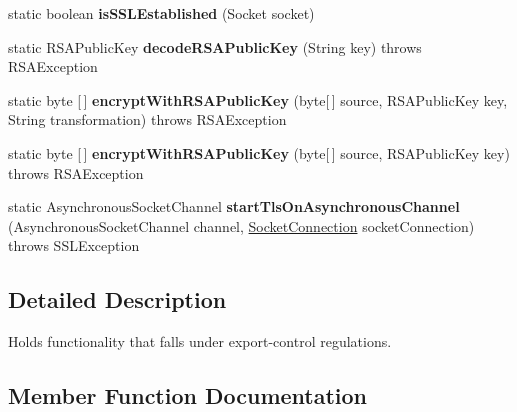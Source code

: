 \begin{DoxyCompactItemize}
static boolean {\bfseries is\+S\+S\+L\+Established} (Socket socket)
\item 
\mbox{\label{classcom_1_1mysql_1_1cj_1_1protocol_1_1_export_controlled_a909eca9940fffbea1168d1f27c6794da}} 
static R\+S\+A\+Public\+Key {\bfseries decode\+R\+S\+A\+Public\+Key} (String key)  throws R\+S\+A\+Exception 
\item 
\mbox{\label{classcom_1_1mysql_1_1cj_1_1protocol_1_1_export_controlled_aa9026bc31e213be6337010026aa89632}} 
static byte \mbox{[}$\,$\mbox{]} {\bfseries encrypt\+With\+R\+S\+A\+Public\+Key} (byte\mbox{[}$\,$\mbox{]} source, R\+S\+A\+Public\+Key key, String transformation)  throws R\+S\+A\+Exception 
\item 
\mbox{\label{classcom_1_1mysql_1_1cj_1_1protocol_1_1_export_controlled_a8a20678c3f99068fe3230c7e60efcf29}} 
static byte \mbox{[}$\,$\mbox{]} {\bfseries encrypt\+With\+R\+S\+A\+Public\+Key} (byte\mbox{[}$\,$\mbox{]} source, R\+S\+A\+Public\+Key key)  throws R\+S\+A\+Exception 
\item 
\mbox{\label{classcom_1_1mysql_1_1cj_1_1protocol_1_1_export_controlled_a0737e8a1422c8d2e5fa6fb9e4dd61caa}} 
static Asynchronous\+Socket\+Channel {\bfseries start\+Tls\+On\+Asynchronous\+Channel} (Asynchronous\+Socket\+Channel channel, \mbox{\hyperlink{interfacecom_1_1mysql_1_1cj_1_1protocol_1_1_socket_connection}{Socket\+Connection}} socket\+Connection)  throws S\+S\+L\+Exception 
\end{DoxyCompactItemize}


\subsection{Detailed Description}
Holds functionality that falls under export-\/control regulations. 

\subsection{Member Function Documentation}
\mbox{\label{classcom_1_1mysql_1_1cj_1_1protocol_1_1_export_controlled_a7e00720fe058b036abef04752934d37a}} 
